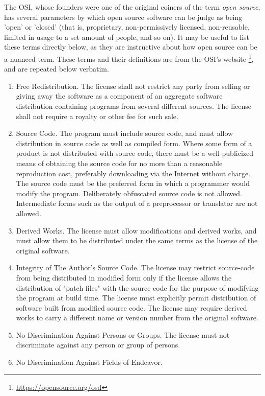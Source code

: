 The OSI, whose founders were one of the original coiners of the term {\it open source}, has several parameters by which open source software can be judge as being 'open' or 'closed' (that is, proprietary, non-permissively licensed, non-reusable, limited in usage to a set amount of people, and so on). It may be useful to list these terms directly below, as they are instructive about how open source can be a nuanced term. These terms and their definitions are from the OSI's website \footnote{\href{https://opensource.org/osd}{https://opensource.org/osd}}, and are repeated below verbatim.

\begin{enumerate}
\item{Free Redistribution}. The license shall not restrict any party from selling or giving away the software as a component of an aggregate software distribution containing programs from several different sources. The license shall not require a royalty or other fee for such sale.
\item{Source Code}. The program must include source code, and must allow distribution in source code as well as compiled form. Where some form of a product is not distributed with source code, there must be a well-publicized means of obtaining the source code for no more than a reasonable reproduction cost, preferably downloading via the Internet without charge. The source code must be the preferred form in which a programmer would modify the program. Deliberately obfuscated source code is not allowed. Intermediate forms such as the output of a preprocessor or translator are not allowed.
\item{Derived Works}. The license must allow modifications and derived works, and must allow them to be distributed under the same terms as the license of the original software.
\item{Integrity of The Author's Source Code}.
  The license may restrict source-code from being distributed in modified form only if the license allows the distribution of "patch files" with the source code for the purpose of modifying the program at build time. The license must explicitly permit distribution of software built from modified source code. The license may require derived works to carry a different name or version number from the original software.
\item{No Discrimination Against Persons or Groups}.
  The license must not discriminate against any person or group of persons.
\item{No Discrimination Against Fields of Endeavor}.

\end{enumerate}
